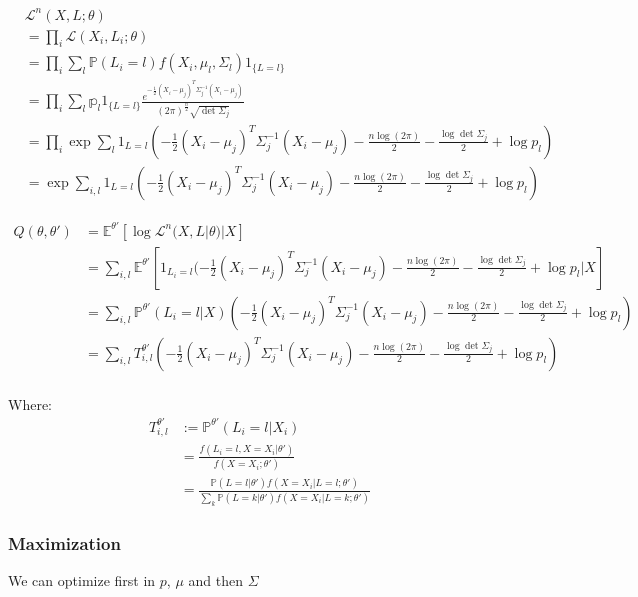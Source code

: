 \documentclass[12pt]{article}
\begin{document}
\begin{align}
&\mathcal L^n (X, L; \theta) \\
&= \prod_i \mathcal L(X_i, L_i; \theta) 
\\&= \prod_i \sum_l \mathbb P (L_i = l) f(X_i, \mu_l, \Sigma_l) 1_{\{L = l\}}
\\&= \prod_i \sum_l \mathbb p_l 1_{\{L = l\}} \frac{e^{-\frac12 (X_i - \mu_j)^T \Sigma_j^{-1}(X_i - \mu_j)}}{(2\pi)^{\frac{n}2} \sqrt{\det \Sigma_j}}
\\&= \prod_i \exp{\sum_l 1_{L = l} ( -\frac12 (X_i - \mu_j)^T \Sigma_j^{-1}(X_i - \mu_j) -\frac{n\log(2\pi)}2  - \frac{\log\det \Sigma_j}2 + \log p_l) }
\\&= \exp{\sum_{i, l} 1_{L = l} ( -\frac12 (X_i - \mu_j)^T \Sigma_j^{-1}(X_i - \mu_j) -\frac{n\log(2\pi)}2  - \frac{\log\det \Sigma_j}2 + \log p_l) }
\end{align}


\begin{align}
Q(\theta, \theta') &= \mathbb{E}^{\theta'}[ \log\mathcal{L}^n(X, L | \theta) | X] \\
&= \sum_{i,l} \mathbb{E}^{\theta'}[1_{L_i = l} ( -\frac12 (X_i - \mu_j)^T \Sigma_j^{-1}(X_i - \mu_j) -\frac{n\log(2\pi)}2  - \frac{\log\det \Sigma_j}2 + \log p_l | X] \\
&= \sum_{i,l} \mathbb{P}^{\theta'}(L_i = l | X) ( -\frac12 (X_i - \mu_j)^T \Sigma_j^{-1}(X_i - \mu_j) -\frac{n\log(2\pi)}2  - \frac{\log\det \Sigma_j}2 + \log p_l)\\
&= \sum_{i,l} T^{\theta'}_{i,l} ( -\frac12 (X_i - \mu_j)^T \Sigma_j^{-1}(X_i - \mu_j) -\frac{n\log(2\pi)}2  - \frac{\log\det \Sigma_j}2 + \log p_l)\\
\end{align}


Where:
\begin{align}
T^{\theta'}_{i,l} &:= \mathbb{P}^{\theta'}(L_i = l | X_i) 
\\&= \frac{f(L_i = l , X=X_i| \theta')}{f(X=X_i; \theta')} 
\\&=  \frac{ \mathbb{P}(L = l|\theta')  f(X=X_i| L = l; \theta')}{\sum_k \mathbb{P}(L = k|\theta') f(X=X_i| L = k; \theta')}
\end{align}

\subsubsection*{Maximization}

We can optimize first in $p$, $\mu$ and then $\Sigma$
\end{document}
